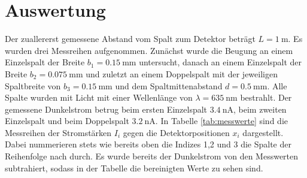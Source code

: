 \section{Auswertung}
\label{sec:Auswertung}

Der zuallererst gemessene Abstand vom Spalt zum Detektor beträgt $L = \SI{1}{\meter}$.
Es wurden drei Messreihen aufgenommen. Zunächst wurde die Beugung an einem Einzelspalt
der Breite $b_1 = \SI{0.15}{\milli\meter}$ untersucht, danach an einem Einzelspalt
der Breite $b_2 = \SI{0.075}{\milli\meter}$ und zuletzt an einem Doppelspalt mit
der jeweiligen Spaltbreite von $b_3 = \SI{0.15}{\milli\meter}$ und dem Spaltmittenabstand
$d = \SI{0.5}{\milli\meter}$. Alle Spalte wurden mit Licht mit einer Wellenlänge
von $\lambda=\SI{635}{\nano\meter}$ bestrahlt. Der gemessene Dunkelstrom betrug beim ersten Einzelspalt
$\SI{3.4}{\nano\ampere}$, beim zweiten Einzelspalt und beim Doppelspalt
$\SI{3.2}{\nano\ampere}$. In Tabelle \ref{tab:messwerte} sind die Messreihen der Stromstärken
$I_i$ gegen die Detektorpositionen $x_i$ dargestellt. Dabei nummerieren stets wie bereits oben die Indizes 1,2 und 3 die
Spalte der Reihenfolge nach durch. Es wurde bereits der Dunkelstrom von den Messwerten
subtrahiert, sodass in der Tabelle die bereinigten Werte zu sehen sind.

